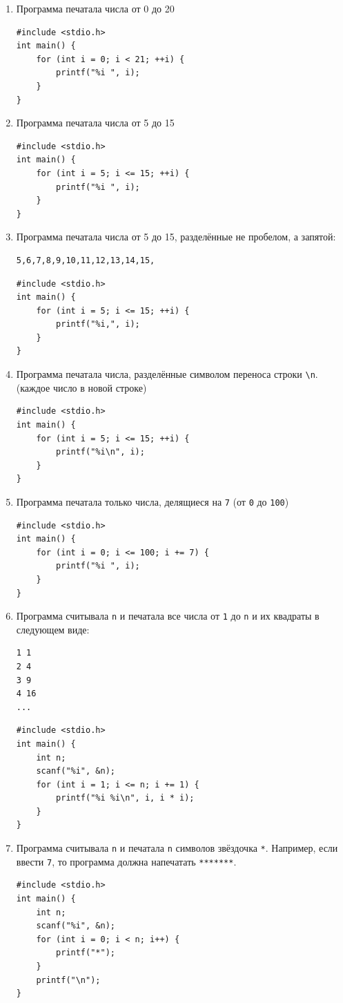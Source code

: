 \documentclass{article}
\begin{document}
\begin{enumerate}
\item Программа печатала числа от 0 до 20
\begin{lstlisting}[backgroundcolor = \color{solcolor}]
#include <stdio.h>
int main() {
    for (int i = 0; i < 21; ++i) {
        printf("%i ", i);
    }
}
\end{lstlisting}

\newpage
\item Программа печатала числа от 5 до 15
\begin{lstlisting}[backgroundcolor = \color{solcolor}]
#include <stdio.h>
int main() {
    for (int i = 5; i <= 15; ++i) {
        printf("%i ", i);
    }
}
\end{lstlisting}
\item Программа печатала числа от 5 до 15, разделённые не пробелом, а запятой:
\begin{verbatim}
5,6,7,8,9,10,11,12,13,14,15,
\end{verbatim}
\begin{lstlisting}[backgroundcolor = \color{solcolor}]
#include <stdio.h>
int main() {
    for (int i = 5; i <= 15; ++i) {
        printf("%i,", i);
    }
}
\end{lstlisting}
\item Программа печатала числа, разделённые символом переноса строки \texttt{\textbackslash n}. (каждое число в новой строке)
\begin{lstlisting}[backgroundcolor = \color{solcolor}]
#include <stdio.h>
int main() {
    for (int i = 5; i <= 15; ++i) {
        printf("%i\n", i);
    }
}
\end{lstlisting}
\item Программа печатала только числа, делящиеся на \texttt{7}  (от \texttt{0} до \texttt{100})
\begin{lstlisting}[backgroundcolor = \color{solcolor}]
#include <stdio.h>
int main() {
    for (int i = 0; i <= 100; i += 7) {
        printf("%i ", i);
    }
}
\end{lstlisting}
\item Программа считывала \texttt{n} и печатала все числа от \texttt{1} до \texttt{n} и их квадраты в следующем виде:
\begin{verbatim}
1 1
2 4
3 9
4 16
...
\end{verbatim}
\begin{lstlisting}[backgroundcolor = \color{solcolor}]
#include <stdio.h>
int main() {
    int n;
    scanf("%i", &n);
    for (int i = 1; i <= n; i += 1) {
        printf("%i %i\n", i, i * i);
    }
}
\end{lstlisting}
\item Программа считывала \texttt{n} и печатала \texttt{n} символов звёздочка \texttt{*}. Например, если ввести \texttt{7}, то программа должна напечатать \texttt{*******}.
\begin{lstlisting}[backgroundcolor = \color{solcolor}]
#include <stdio.h>
int main() {
    int n;
    scanf("%i", &n);
    for (int i = 0; i < n; i++) {
        printf("*");
    }
    printf("\n");
}
\end{lstlisting}
\end{enumerate}
\end{document}
